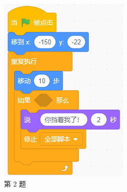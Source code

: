 \documentclass[10pt, a4paper]{article}
\begin{document}
\begin{enumerate}
        \begin{figure}[htbp]
            \centering
            \begin{minipage}[t]{.2\textwidth}
                \centering
                \includegraphics[width=\textwidth]{2.png}
                \caption*{第 2 题}
            \end{minipage}
            \begin{minipage}[t]{.26\textwidth}
                \centering

\end{minipage}
\end{figure}
\end{enumerate}
\end{document}
